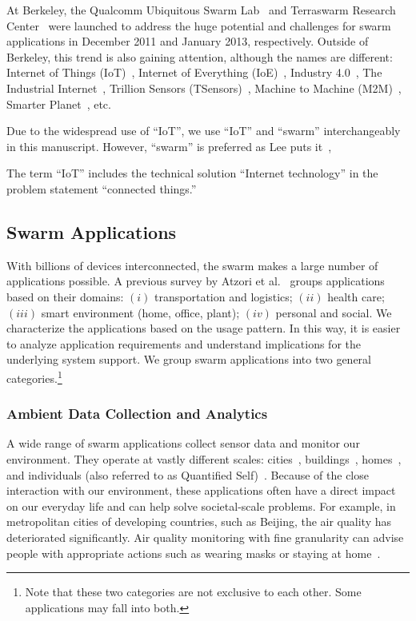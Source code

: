 At Berkeley, the Qualcomm Ubiquitous Swarm Lab~\cite{swarmlab} and Terraswarm
Research Center~\cite{terraswarm} were launched to address the huge potential
and challenges for swarm applications in December 2011 and January 2013,
respectively. Outside of Berkeley, this trend is also gaining attention,
although the names are different: Internet of Things
(IoT)~\cite{atzori2010internet}, Internet of Everything
(IoE)~\cite{bradley2013internet}, Industry 4.0~\cite{lasi2014industry}, The
Industrial Internet~\cite{eigner2018industrial}, Trillion Sensors
(TSensors)~\cite{bogue2014towards}, Machine to Machine
(M2M)~\cite{anton2014machine}, Smarter Planet~\cite{palmisano2008smarter}, etc.

Due to the widespread use of ``IoT'', we use ``IoT'' and ``swarm''
interchangeably in this manuscript. However, ``swarm'' is preferred as Lee puts
it~\cite{lee2016iot},

\begin{displayquote}
  The term ``IoT'' includes the technical solution ``Internet technology'' in
  the problem statement ``connected things.''
\end{displayquote}

\subsection{Swarm Applications}
\label{sec:swarm-applications}

With billions of devices interconnected, the swarm makes a large number of
applications possible. A previous survey by Atzori et
al.~\cite{atzori2010internet} groups applications based on their domains: $(i)$
transportation and logistics; $(ii)$ health care; $(iii)$ smart environment
(home, office, plant); $(iv)$ personal and social. We characterize the
applications based on the usage pattern. In this way, it is easier to analyze
application requirements and understand implications for the underlying system
support. We group swarm applications into two general categories.\footnote{Note
  that these two categories are not exclusive to each other. Some applications
  may fall into both.}

\subsubsection{Ambient Data Collection and Analytics}
\label{sec:ambi-data-coll}

A wide range of swarm applications collect sensor data and monitor our
environment. They operate at vastly different scales:
cities~\cite{cheng2014aircloud, sfpark}, buildings~\cite{dawson2010smap},
homes~\cite{hnat2011hitchhiker}, and individuals (also referred to as Quantified
Self)~\cite{fitbit, swan2013quantified}. Because of the close interaction with
our environment, these applications often have a direct impact on our everyday
life and can help solve societal-scale problems. For example, in metropolitan
cities of developing countries, such as Beijing, the air quality has
deteriorated significantly. Air quality monitoring with fine granularity can
advise people with appropriate actions such as wearing masks or staying at
home~\cite{cheng2014aircloud}.


